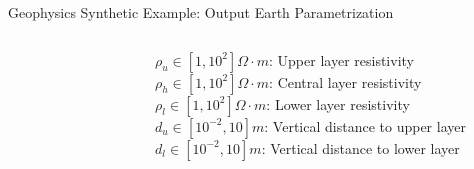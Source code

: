 \begin{frame}{Geophysics Synthetic Example: Output Earth Parametrization}
\begin{columns}
    \begin{column}{0.35\textwidth}
    \begin{figure}[!h]
	\centering
	
	\label{fig:param}
	\end{figure}
    \end{column}
    \begin{column}{0.5\textwidth}
        {\footnotesize $\rho_u \in [1,10^2] \Omega \cdot m$: Upper layer resistivity}\\
        \vspace{0.3cm}
        {\footnotesize $\rho_h \in [1,10^2] \Omega \cdot m$: Central layer resistivity}\\
        \vspace{0.3cm}
        {\footnotesize $\rho_l \in [1,10^2] \Omega \cdot m$: Lower layer resistivity}\\
        \vspace{0.3cm}
        {\footnotesize $d_u \in [10^{-2},10] m$: Vertical distance to upper layer}\\
        \vspace{0.3cm}
        {\footnotesize $d_l \in [10^{-2},10] m$: Vertical distance to lower layer}
    \end{column}
\end{columns}
\end{frame}


